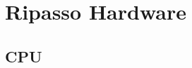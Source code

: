 \documentclass[a4paper]{article}
\begin{document}

\section{Ripasso Hardware}


\subsection{CPU}
\end{document}
